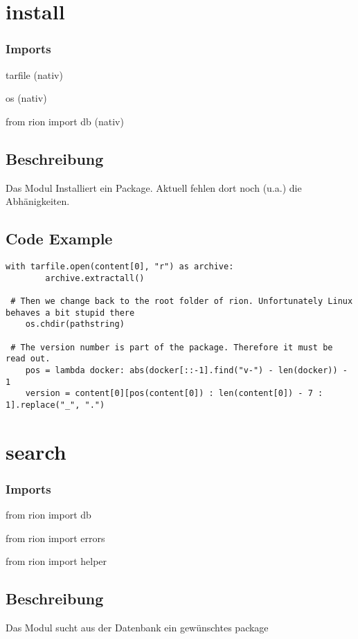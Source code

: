 \documentclass[fleqn,10pt]{olplainarticle}
\begin{document}
\section{install}
\subsubsection{Imports}
    \item tarfile (nativ)
    \item  os (nativ)
    \item from rion import db (nativ)
\subsection{Beschreibung}
Das Modul Installiert ein Package. Aktuell fehlen dort noch (u.a.) die Abhänigkeiten.
\subsection{Code Example}
\begin{lstlisting}[breaklines=true]
 with tarfile.open(content[0], "r") as archive:
        archive.extractall()

 # Then we change back to the root folder of rion. Unfortunately Linux behaves a bit stupid there
    os.chdir(pathstring)

 # The version number is part of the package. Therefore it must be read out.
    pos = lambda docker: abs(docker[::-1].find("v-") - len(docker)) - 1
    version = content[0][pos(content[0]) : len(content[0]) - 7 : 1].replace("_", ".")
\end{lstlisting}


\section{search}
\subsubsection{Imports}
    \item from rion import db
    \item  from rion import errors
    \item from rion import helper
\subsection{Beschreibung}
Das Modul sucht aus der Datenbank ein gewünschtes package
\end{document}
